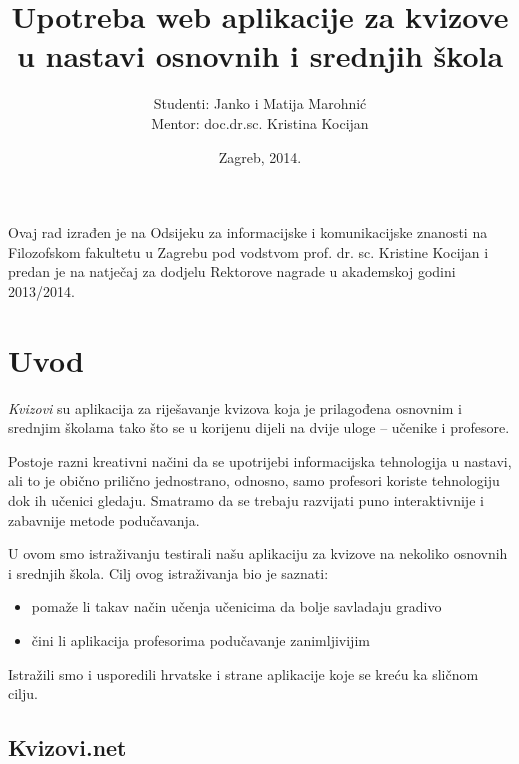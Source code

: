 \documentclass{scrreprt}
\begin{document}
\titlehead{Sveučilište u Zagrebu\\Filozofski fakultet\\Odsijek za informacijske
i komunikacijske znanosti\\Akademska godina 2013/14.}
\title{Upotreba web aplikacije za kvizove u nastavi osnovnih i srednjih škola}
\author{Studenti: Janko i Matija Marohnić\\Mentor: doc.dr.sc. Kristina Kocijan}
\date{Zagreb, 2014.}

\maketitle

\pagebreak

Ovaj rad izrađen je na Odsijeku za informacijske i komunikacijske znanosti na
Filozofskom fakultetu u Zagrebu pod vodstvom prof. dr. sc. Kristine Kocijan i
predan je na natječaj za dodjelu Rektorove nagrade u akademskoj godini
2013/2014.

\pagebreak

\tableofcontents

\chapter{Uvod}

\emph{Kvizovi} su aplikacija za riješavanje kvizova koja je prilagođena osnovnim
i srednjim školama tako što se u korijenu dijeli na dvije uloge -- učenike i
profesore.

Postoje razni kreativni načini da se upotrijebi informacijska tehnologija u
nastavi, ali to je obično prilično jednostrano, odnosno, samo profesori koriste
tehnologiju dok ih učenici gledaju. Smatramo da se trebaju razvijati puno
interaktivnije i zabavnije metode podučavanja.

U ovom smo istraživanju testirali našu aplikaciju za kvizove na nekoliko
osnovnih i srednjih škola. Cilj ovog istraživanja bio je saznati:

\begin{itemize}
  \item pomaže li takav način učenja učenicima da bolje savladaju gradivo
  \item čini li aplikacija profesorima podučavanje zanimljivijim
\end{itemize}

Istražili smo i usporedili hrvatske i strane aplikacije koje se kreću ka sličnom
cilju.

\section{Kvizovi.net}
\end{document}

